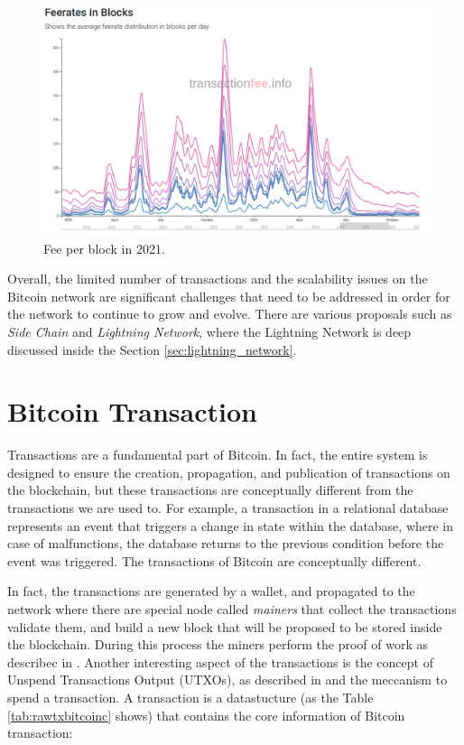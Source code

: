 \begin{figure}
    \begin{center}
      \includegraphics[scale=0.3]{imgs/feerate_blocks.png}
    \end{center}
    \caption{Fee per block in 2021.}
    \label{fig:fee_x_block}
\end{figure}


Overall, the limited number of transactions and the scalability issues on the Bitcoin network
are significant challenges that need to be addressed in order for the network to continue
to grow and evolve. There are various proposals such as \emph{Side Chain} and \emph{Lightning Network}, 
where the Lightning Network is deep discussed inside the Section \ref{sec:lightning_network}.


\section{Bitcoin Transaction}

Transactions are a fundamental part of Bitcoin. In fact, the entire system is designed to ensure
the creation, propagation, and publication of transactions on the blockchain, but these
transactions are conceptually different from the transactions we are used to.
For example, a transaction in a relational database represents an event that triggers a
change in state within the database, where in case of malfunctions, the database returns
to the previous condition before the event was triggered.
The transactions of Bitcoin are conceptually different.

In fact, the transactions are generated by a wallet, and propagated to the network
where there are special node called \emph{mainers} that collect the transactions
validate them, and build a new block that will be proposed to be stored inside 
the blockchain. During this process the miners perform the proof of work as 
describec in \cite{Palazzo_Estrazione_di_Informazioni_2021}.
Another interesting aspect of the transactions is the concept of 
Unspend Transactions Output (UTXOs), as described in \cite{Palazzo_Estrazione_di_Informazioni_2021} 
and the meccanism to spend a transaction.
A transaction is a datastucture (as the Table \ref{tab:rawtxbitcoinc} shows) that contains the core information
of Bitcoin transaction: 

